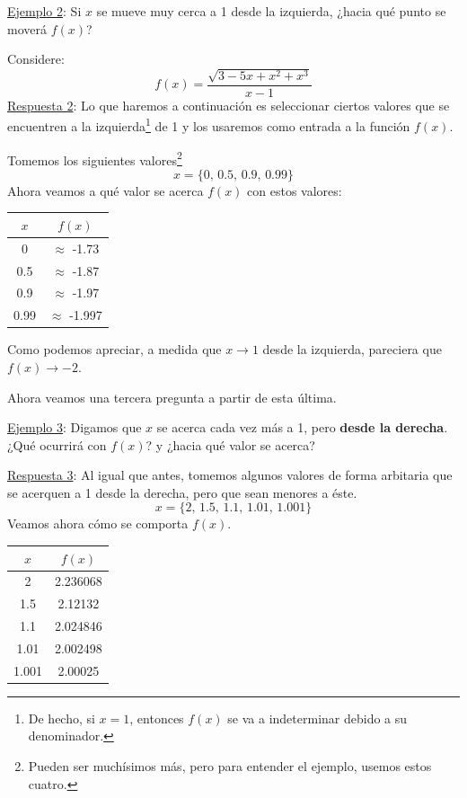 \documentclass[12pt]{article}
\begin{document}
\newpage

\underline{Ejemplo 2}: Si $x$ se mueve muy cerca a 1 desde la izquierda, ¿hacia qué punto se moverá $f(x)$?

Considere:
\[f(x) = \frac{\sqrt{3-5x+x^{2}+x^{3}}}{x-1}\]
\underline{Respuesta 2}: Lo que haremos a continuación es seleccionar ciertos valores que se encuentren a la izquierda\footnote{De hecho, si $x = 1$, entonces $f(x)$ se va a indeterminar debido a su denominador.} de 1 y los usaremos como entrada a la función $f(x)$.

Tomemos los siguientes valores\footnote{Pueden ser muchísimos más, pero para entender el ejemplo, usemos estos cuatro.}
\[x = \{0,\, 0.5,\, 0.9,\, 0.99\}\]
Ahora veamos a qué valor se acerca $f(x)$ con estos valores:

\begin{center}
\begin{tabular}{c | c}

$x$ & $f(x)$ \\
\hline
0 & $\approx$ -1.73\\
0.5 & $\approx$ -1.87\\
0.9 & $\approx$ -1.97\\
0.99 & $\approx$ -1.997\\

\end{tabular}
\end{center}

Como podemos apreciar, a medida que $x \to 1$ desde la izquierda, pareciera que $f(x) \to -2$.

Ahora veamos una tercera pregunta a partir de esta última.

\underline{Ejemplo 3}: Digamos que $x$ se acerca cada vez más a 1, pero \textbf{desde la derecha}. ¿Qué ocurrirá con $f(x)$? y ¿hacia qué valor se acerca?

\underline{Respuesta 3}: Al igual que antes, tomemos algunos valores de forma arbitaria que se acerquen a 1 desde la derecha, pero que sean menores a éste.
\[x = \{2,\, 1.5,\, 1.1,\, 1.01,\, 1.001\}\]
Veamos ahora cómo se comporta $f(x)$.

\begin{center}
\begin{tabular}{c | c}

$x$ & $f(x)$ \\
\hline
2 & 2.236068\\
1.5 & 2.12132\\
1.1 & 2.024846\\
1.01 & 2.002498\\
1.001 & 2.00025\\

\end{tabular}
\end{center}
\end{document}
